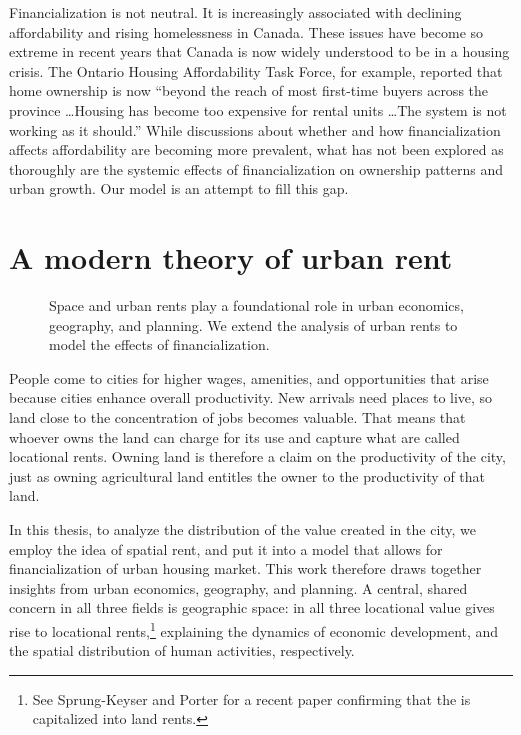 Financialization is not neutral. It is increasingly associated with declining affordability and rising homelessness in Canada. These issues have become so extreme in recent years that Canada is now widely understood to be in a housing crisis. The Ontario Housing Affordability Task Force, for example, reported that home ownership is now ``beyond the reach of most first-time buyers across the province \dots Housing has become too expensive for rental units \dots The system is not working as it should.'' While discussions about whether and how financialization affects affordability are becoming more prevalent, what has not been explored as thoroughly are the systemic effects of financialization on ownership patterns and urban growth. Our model is an attempt to fill this gap.%

\section{A modern theory of urban rent}
\begin{figure}[!ht]
\centering

\caption[Linking space and urban rents to the effects of financialization.]{Space and urban rents play a foundational role in urban economics, geography, and planning. We extend the analysis of urban rents to model the effects of financialization.}
\label{fig-fields}
\end{figure}

People come to cities for higher wages, amenities, and opportunities that arise because cities enhance overall productivity. New arrivals need places to live, so land close to the concentration of jobs becomes valuable. That means that whoever owns the land can charge for its use and capture what are called \glspl{locational rent}. Owning land is therefore a claim on the productivity of the city, just as owning agricultural land entitles the owner to the productivity of that land. %

In this thesis, to analyze the distribution of the value created in the city, we employ the idea of spatial rent, and put it into a model that allows for financialization of urban housing market. This work therefore draws together insights from urban economics, geography, and planning. A central, shared concern in all three fields is geographic space: in all three locational value gives rise to locational rents,\footnote{See Sprung-Keyser and Porter \cite{medina-olivaresJointModelLongitudinal2023} for a recent paper confirming that the is capitalized into land rents.}  explaining the dynamics of economic development, and the spatial distribution of human activities,  respectively. 

